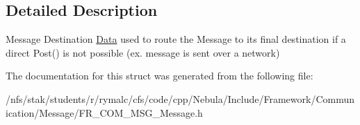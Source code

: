 \subsection{Detailed Description}
Message Destination \hyperlink{structFramework_1_1Communication_1_1Message_1_1Data}{Data} used to route the Message to its final destination if a direct Post() is not possible (ex. message is sent over a network) 

The documentation for this struct was generated from the following file:\begin{DoxyCompactItemize}
\item 
/nfs/stak/students/r/rymalc/cfs/code/cpp/Nebula/Include/Framework/Communication/Message/FR\_\-COM\_\-MSG\_\-Message.h\end{DoxyCompactItemize}
